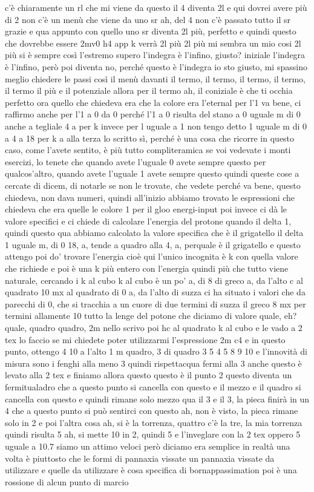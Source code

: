 \begin{soluzione}
{   c'è chiaramente un rl che mi viene da questo il 4 diventa 2l e qui dovrei avere più di 2 non c'è un menù che viene da uno sr ah, del 4 non c'è passato tutto il sr grazie e qua appunto con quello uno sr diventa 2l più, perfetto e quindi questo che dovrebbe essere 2mv0 h4 app k verrà 2l più 2l più mi sembra un mio cosi 2l più si è sempre così l'estremo supero l'indegra è l'infino, giusto? iniziale l'indegra è l'infino, però poi diventa no, perché questo è l'indegra io sto giusto, mi spassino meglio chiedere le passi così il menù davanti il termo, il termo, il termo, il termo, il termo il più e il potenziale allora per il termo ah, il coniziale è che ti occhia perfetto ora quello che chiedeva era che la colore era l'eternal per l'1 va bene, ci raffirmo anche per l'1 a 0 da 0 perché l'1 a 0 risulta del stano a 0 uguale m di 0 anche a tegliale 4 a per k invece per l uguale a 1 non tengo detto 1 uguale m di 0 a 4 a 18 per k a alla terza lo scritto sì, perché è una cosa che ricorre in questo caso, come l'avete sentito, è più tutto compliteramica se voi vedevate i monti esercizi, lo tenete che quando avete l'uguale 0 avete sempre questo per qualcos'altro, quando avete l'uguale 1 avete sempre questo quindi queste cose a cercate di dicem, di notarle se non le trovate, che vedete perché va bene, questo chiedeva, non dava numeri, quindi all'inizio abbiamo trovato le espressioni che chiedeva che era quelle le colore 1 per il gloo energi-input poi invece ci dà le valore specifici e ci chiede di calcolare l'energia del protone quando il delta 1, quindi questo qua abbiamo calcolato la valore specifica che è il grigatello il delta 1 uguale m, di 0 18, a, tende a quadro alla 4, a, perquale è il grigatello e questo attengo poi do' trovare l'energia cioè qui l'unico incognita è k con quella valore che richiede e poi è una k più entero con l'energia quindi più che tutto viene naturale, cercando i k al cubo k al cubo è un po' a, di 8 di greco a, da l'alto c al quadrato 10 mx al quadrato di 0 a, da l'alto di suzza ci ha situato i valori che da parecchi di 0, che si tracchia a un cuore di due termini di suzza il greco 8 mx per termini allamente 10 tutto la lenge del potone che diciamo di valore quale, eh? quale, quadro quadro, 2m nello scrivo poi hc al quadrato k al cubo e le vado a 2 tex lo faccio se mi chiedete poter utilizzarmi l'espressione 2m c4 e in questo punto, ottengo 4 10 a l'alto 1 m quadro, 3 di quadro 3 5 4 5 8 9 10 e l'innovità di misura sono i fenghi alla meno 3 quindi rispettacqua fermi alla 3 anche questo è levato alla 2 tex e finiamo allora questo questo è il punto 2 questo diventa un fermitualadro che a questo punto si cancella con questo e il mezzo e il quadro si cancella con questo e quindi rimane solo mezzo qua il 3 e il 3, la pieca finirà in un 4 che a questo punto si può sentirci con questo ah, non è visto, la pieca rimane solo in 2 e poi l'altra cosa ah, si è la torrenza, quattro c'è la tre, la mia torrenza quindi risulta 5 ah, si mette 10 in 2, quindi 5 e l'inveglare con la 2 tex oppero 5 uguale a 10.7 siamo un attimo veloci però diciamo era semplice in realtà una volta è piuttosto che le formi di pannaxia vissate un pannaxia vissate da utilizzare e quelle da utilizzare è cosa specifica di bornappassimation poi è una rossione di alcun punto di marcio }
\end{soluzione}
